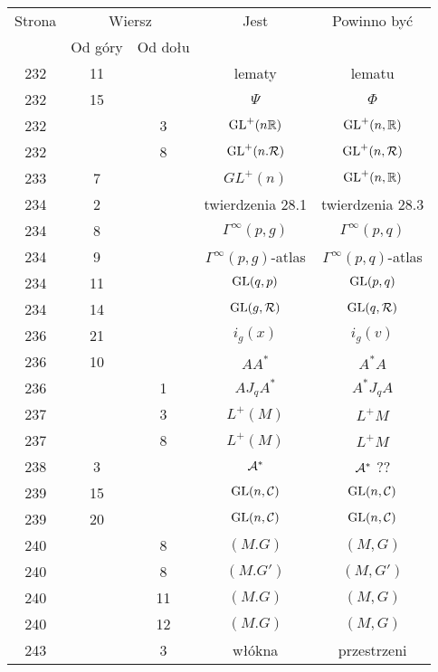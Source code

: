 \documentclass[a4paper,11pt]{article}
\begin{document}
\begin{center}
  \begin{tabular}{|c|c|c|c|c|}
    \hline
    Strona & \multicolumn{2}{c|}{Wiersz} & Jest
                              & Powinno być \\ \cline{2-3}
    & Od góry & Od dołu & & \\
    \hline
    232 & 11 & & lematy & lematu \\
    232 & 15 & & $\Psi$ & $\Phi$ \\
    232 & & \hphantom{0}3 & $\mathrm{GL}^{ + }( n \mathbb{R} )$ & $\mathrm{GL}^{ + }( n, \mathbb{R} )$ \\
    232 & & \hphantom{0}8 & $\mathrm{GL}^{ + }( n. \mathcal{R} )$
    & $\mathrm{GL}^{ + }( n, \mathcal{R} )$ \\
    233 & \hphantom{0}7 & & $GL^{ + }( n )$ & $\mathrm{GL}^{ + }( n, \mathbb{R} )$ \\
    234 & \hphantom{0}2 & & twierdzenia 28.1 & twierdzenia 28.3 \\
    234 & \hphantom{0}8 & & $\Gamma^{ \infty }( p, g )$ & $\Gamma^{ \infty }( p, q )$ \\
    234 & \hphantom{0}9 & & $\Gamma^{ \infty }( p, g )$-atlas
           & $\Gamma^{ \infty }( p, q )$-atlas \\
    234 & 11 & & $\mathrm{GL}( q, p )$ & $\mathrm{GL}( p, q )$ \\
    234 & 14 & & $\mathrm{GL}( g, \mathcal{R} )$ & $\mathrm{GL}( q, \mathcal{R} )$ \\
    236 & 21 & & $i_{ g }( x )$ & $i_{ g }( v )$ \\
    236 & 10 & & $A A^{ * }$ & $A^{ * } A$ \\
    236 & & \hphantom{0}1 & $A J_{ q } A^{ * }$ & $A^{ * } J_{ q } A$ \\
    237 & & \hphantom{0}3 & $L^{ + }( M )$ & $L^{ + }M$ \\
    237 & & \hphantom{0}8 & $L^{ + }( M )$ & $L^{ + }M$ \\
    238 & \hphantom{0}3 & & $\mathcal{A}^{ * }$ & $\mathcal{A}^{ * }$ ?? \\
    239 & 15 & & $\mathrm{GL}( n, \mathcal{C} )$ & $\mathrm{GL}( n, \mathcal{C} )$ \\
    239 & 20 & & $\mathrm{GL}( n, \mathcal{C} )$ & $\mathrm{GL}( n, \mathcal{C} )$ \\
    240 & & \hphantom{0}8 & $( M. G )$ & $( M, G )$ \\
    240 & & \hphantom{0}8 & $( M. G' )$ & $( M, G' )$ \\
    240 & & 11 & $( M. G )$ & $( M, G )$ \\
    240 & & 12 & $( M. G )$ & $( M, G )$ \\
    243 & & \hphantom{0}3 & włókna & przestrzeni \\

\end{tabular}
\end{center}
\end{document}
